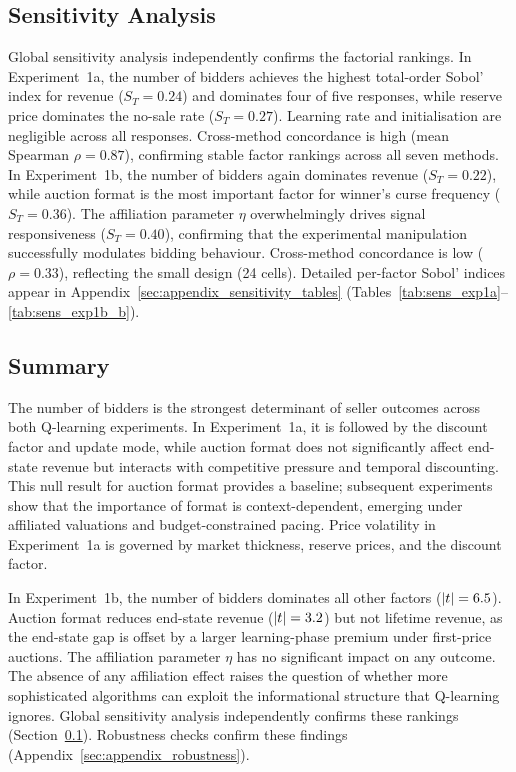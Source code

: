 \subsection{Sensitivity Analysis}
\label{sec:qlearning_sensitivity}

Global sensitivity analysis independently confirms the factorial rankings. In Experiment~1a, the number of bidders achieves the highest total-order Sobol' index for revenue ($S_T = 0.24$) and dominates four of five responses, while reserve price dominates the no-sale rate ($S_T = 0.27$). Learning rate and initialisation are negligible across all responses. Cross-method concordance is high (mean Spearman $\rho = 0.87$), confirming stable factor rankings across all seven methods. In Experiment~1b, the number of bidders again dominates revenue ($S_T = 0.22$), while auction format is the most important factor for winner's curse frequency ($S_T = 0.36$). The affiliation parameter $\eta$ overwhelmingly drives signal responsiveness ($S_T = 0.40$), confirming that the experimental manipulation successfully modulates bidding behaviour. Cross-method concordance is low ($\rho = 0.33$), reflecting the small design (24 cells). Detailed per-factor Sobol' indices appear in Appendix~\ref{sec:appendix_sensitivity_tables} (Tables~\ref{tab:sens_exp1a}--\ref{tab:sens_exp1b_b}).

\subsection{Summary}

The number of bidders is the strongest determinant of seller outcomes across both Q-learning experiments. In Experiment~1a, it is followed by the discount factor and update mode, while auction format does not significantly affect end-state revenue but interacts with competitive pressure and temporal discounting. This null result for auction format provides a baseline; subsequent experiments show that the importance of format is context-dependent, emerging under affiliated valuations and budget-constrained pacing. Price volatility in Experiment~1a is governed by market thickness, reserve prices, and the discount factor.

In Experiment~1b, the number of bidders dominates all other factors ($|t| = 6.5$). Auction format reduces end-state revenue ($|t| = 3.2$) but not lifetime revenue, as the end-state gap is offset by a larger learning-phase premium under first-price auctions. The affiliation parameter $\eta$ has no significant impact on any outcome. The absence of any affiliation effect raises the question of whether more sophisticated algorithms can exploit the informational structure that Q-learning ignores. Global sensitivity analysis independently confirms these rankings (Section~\ref{sec:qlearning_sensitivity}). Robustness checks confirm these findings (Appendix~\ref{sec:appendix_robustness}).
